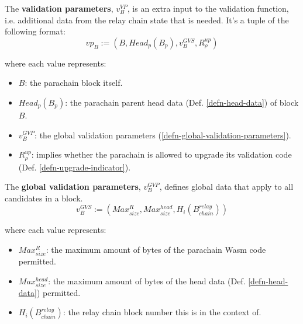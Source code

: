 \begin{definition}  \label{defn-extra-validation-data}
  The \textbf{validation parameters}, $v^{VP}_B$, is an extra input to the validation
  function, i.e. additional data from the relay chain state that is needed.
  It's a tuple of the following format:
  \[
  vp_B := (B, Head_p(B_p), v^{GVS}_B, R^{up}_{\rho})
  \]

  where each value represents:

  \begin{itemize}
    \item $B$: the parachain block itself.
    \item $Head_p(B_p)$: the parachain parent head data (Def.
    \ref{defn-head-data}) of block $B$.
    \item $v^{GVP}_B$: the global validation parameters
    (\ref{defn-global-validation-parameters}).
    \item $R^{up}_{\rho}$: implies whether the parachain is allowed to upgrade
    its validation code (Def. \ref{defn-upgrade-indicator}).
  \end{itemize}
\end{definition}

\begin{definition}
  \label{defn-global-validation-parameters}
  The \textbf{global validation parameters}, $v^{GVP}_B$, defines global data 
  that apply to all candidates in a block.
  \[
    v^{GVS}_B := (Max^{R}_{size}, Max^{head}_{size}, H_i(B^{relay}_{chain}))
  \]

  where each value represents:

  \begin{itemize}
    \item $Max^{R}_{size}$: the maximum amount of bytes of the parachain Wasm
    code permitted.
    \item $Max^{head}_{size}$: the maximum amount of bytes of the head data
    (Def. \ref{defn-head-data}) permitted.
    \item $H_i(B^{relay}_{chain})$: the relay chain block number this is in the
    context of.
  \end{itemize}
\end{definition}

